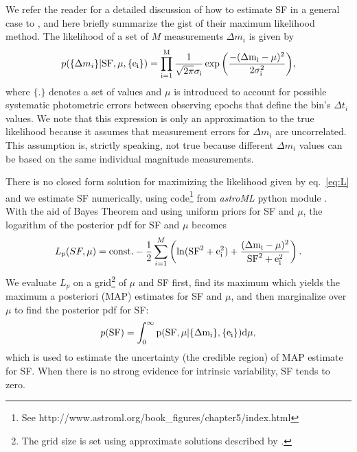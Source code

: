 \documentclass[fleqn,usenatbib]{mnras}  %
\begin{document}
We refer the reader for a detailed discussion of how to estimate SF in a general case to \cite{ivezic2014}, 
and here briefly summarize the gist of their maximum likelihood method. The likelihood of a set of $M$
measurements $\Delta m_i$ is given by 
\begin{equation}
\label{eq:L}
p(\{\Delta m_{i}\} | \rm{SF}, \mu, \{e_{i}\} ) = 
 \prod _{i=1}^{M} { \frac{1}{\sqrt{2\pi} \sigma_i} \exp{\left( \frac{-(\Delta m_{i}-\mu)^{2}}{2\sigma_i^{2}} \right)}},
\end{equation}
where $\{.\}$ denotes a set of values and $\mu$ is introduced to account for possible systematic photometric 
errors between observing epochs that define the bin's $\Delta t_i$ values. We note that this expression is only 
an approximation to the true likelihood because it assumes that measurement errors for $\Delta m_i$ are 
uncorrelated. This assumption is, strictly speaking, not true because different $\Delta m_i$ values can be 
based on the same individual magnitude measurements. 

There is no closed form solution for maximizing the likelihood given by eq.~\ref{eq:L} and
we estimate SF numerically, using code\footnote{See http://www.astroml.org/book\_figures/chapter5/index.html}
from {\it astroML} python module \citep{astroML}. With the aid of Bayes Theorem and using uniform priors
for SF and $\mu$, the logarithm of the posterior pdf for SF and $\mu$ becomes
\begin{equation}
\label{eq:logP}
L_p(SF,\mu) = {\rm const.} - {1\over2} \sum_{i=1}^M \left( \ln(\rm{SF}^2+e_i^2)
               + {  (\Delta m_i-\mu)^2 \over \rm{SF}^2+e_i^2} \right).
\end{equation}
We evaluate $L_{p}$ on a grid\footnote{The grid size is set using approximate solutions described by \cite{ivezic2014}.}
of $\mu$ and SF first, find its maximum which yields the maximum a posteriori (MAP) estimates for SF and $\mu$, 
and then marginalize over $\mu$ to find the posterior pdf for SF: 
\begin{equation}
p(\rm{SF}) = \int_{0}^{\infty} {p(\rm{SF}, \mu |\{\Delta m_{i}\}, \{e_{i}\})} d \mu,
\end{equation}
which is used to estimate the uncertainty (the credible region) of MAP estimate for SF. When there is no strong 
evidence for intrinsic variability, SF tends to zero. 

\end{document}
